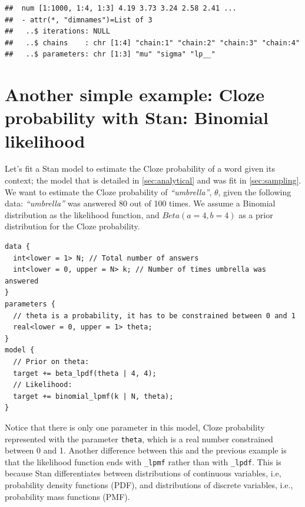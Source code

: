 \documentclass[12pt,]{krantz}
\newenvironment{Shaded}{\begin{snugshade}}{\end{snugshade}}
\newcommand{\KeywordTok}[1]{\textcolor[rgb]{0.13,0.29,0.53}{\textbf{#1}}}
\newcommand{\StringTok}[1]{\textcolor[rgb]{0.31,0.60,0.02}{#1}}
\newcommand{\OperatorTok}[1]{\textcolor[rgb]{0.81,0.36,0.00}{\textbf{#1}}}
\newcommand{\NormalTok}[1]{#1}
\theoremstyle{definition}
\theoremstyle{definition}
\theoremstyle{definition}
\theoremstyle{remark}
\begin{document}
\begin{Shaded}
\end{Shaded}

\begin{verbatim}
##  num [1:1000, 1:4, 1:3] 4.19 3.73 3.24 2.58 2.41 ...
##  - attr(*, "dimnames")=List of 3
##   ..$ iterations: NULL
##   ..$ chains    : chr [1:4] "chain:1" "chain:2" "chain:3" "chain:4"
##   ..$ parameters: chr [1:3] "mu" "sigma" "lp__"
\end{verbatim}

\section{Another simple example: Cloze probability with Stan: Binomial
likelihood}\label{sec:clozestan}

Let's fit a Stan model to estimate the Cloze probability of a word given
its context; the model that is detailed in \ref{sec:analytical} and was
fit in \ref{sec:sampling}. We want to estimate the Cloze probability of
\emph{``umbrella''}, \(\theta\), given the following data:
\emph{``umbrella''} was answered 80 out of 100 times. We assume a
Binomial distribution as the likelihood function, and \(Beta(a=4,b=4)\)
as a prior distribution for the Cloze probability.

\begin{verbatim}
data {
  int<lower = 1> N; // Total number of answers
  int<lower = 0, upper = N> k; // Number of times umbrella was answered
}
parameters {
  // theta is a probability, it has to be constrained between 0 and 1
  real<lower = 0, upper = 1> theta;
}
model {
  // Prior on theta:
  target += beta_lpdf(theta | 4, 4); 
  // Likelihood:
  target += binomial_lpmf(k | N, theta); 
}
\end{verbatim}

Notice that there is only one parameter in this model, Cloze probability
represented with the parameter \texttt{theta}, which is a real number
constrained between 0 and 1. Another difference between this and the
previous example is that the likelihood function ends with
\texttt{\_lpmf} rather than with \texttt{\_lpdf}. This is because Stan
differentiates between distributions of continuous variables, i.e,
probability density functions (PDF), and distributions of discrete
variables, i.e., probability mass functions (PMF).
\end{document}
